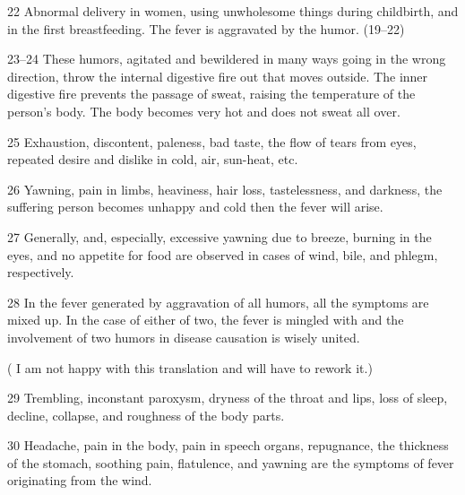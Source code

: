 \begin{translation}
    \item[22] Abnormal delivery in women, using unwholesome things during
    childbirth, and in the first breastfeeding. The fever is aggravated by
    the humor. (19--22)
    
    \item[23--24]  These humors, agitated and bewildered in many ways going in 
the
    wrong direction, throw the internal digestive fire out that moves
    outside. The inner digestive fire prevents the passage of sweat, raising
    the temperature of the person's body. The body becomes very hot and does
    not sweat all over.
    
    
    \item[25]  Exhaustion, discontent, paleness, bad taste, the flow of tears from
    eyes, repeated desire and dislike in cold, air, sun-heat, etc.
    
    \item[26]  Yawning, pain in limbs, heaviness, hair loss, tastelessness, and
    darkness, the suffering person becomes unhappy and cold then the fever
    will arise.
    
    
    \item[27]  Generally, and, especially, excessive yawning due to breeze, 
burning
    in the eyes, and no appetite for food are observed in cases of wind,
    bile, and phlegm, respectively.
    
    
    \item[28]  In the fever generated by aggravation of all humors, all the
    symptoms are mixed up. In the case of either of two, the fever is
    mingled with and the involvement of two humors in disease causation is
    wisely united.
    
    ( I am not happy with this translation and will have to rework it.)
    
    \item[29]  Trembling, inconstant paroxysm, dryness of the throat and lips, 
loss
    of sleep, decline, collapse, and roughness of the body parts.
    
    
    \item[30]  Headache, pain in the body, pain in speech organs, repugnance, 
the
    thickness of the stomach, soothing pain, flatulence, and yawning are the
    symptoms of fever originating from the wind.
    

\end{translation}
